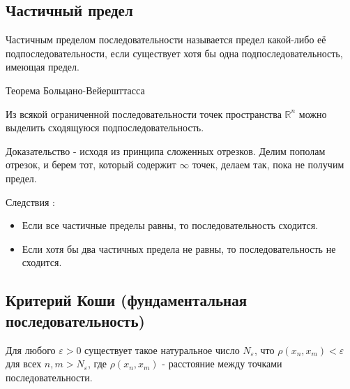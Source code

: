 \subsection{Частичный предел}

Частичным пределом последовательности называется предел какой-либо её подпоследовательности, если существует хотя бы одна подпоследовательность, имеющая предел.

Теорема Больцано-Вейершттасса

Из всякой ограниченной последовательности точек пространства $\mathbb{R}^n$ можно выделить сходящуюся подпоследовательность.

Доказательство - исходя из принципа сложенных отрезков. Делим пополам отрезок, и берем тот, который содержит $\infty$ точек, делаем так, пока не получим предел.

Следствия :

\begin{itemize}
\item 
Если все частичные пределы равны, то последовательность сходится.

\item 
Если хотя бы два частичных предела не равны, то последовательность не сходится.

\end{itemize}

\subsection{Критерий Коши (фундаментальная последовательность)}

Для любого $\varepsilon > 0$ существует такое натуральное число $N_\varepsilon$, что $\rho(x_{n}, x_{m}) < \varepsilon\ $ для всех $ n, m > N_\varepsilon$, где $\rho(x_{n}, x_{m})$ - расстояние между точками последовательности.